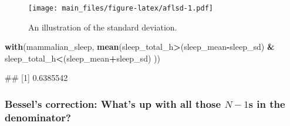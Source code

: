 \documentclass[
]{book}
\newenvironment{Shaded}{\begin{snugshade}}{\end{snugshade}}
\newcommand{\FunctionTok}[1]{\textcolor[rgb]{0.13,0.29,0.53}{\textbf{#1}}}
\newcommand{\NormalTok}[1]{#1}
\newcommand{\SpecialCharTok}[1]{\textcolor[rgb]{0.81,0.36,0.00}{\textbf{#1}}}
\begin{document}
\begin{figure}
\centering
\texttt{[image: main\_files/figure-latex/aflsd-1.pdf]}
\caption{\label{fig:aflsd}An illustration of the standard deviation.}
\end{figure}

\begin{Shaded}
\begin{Highlighting}[]
  \FunctionTok{with}\NormalTok{(mammalian\_sleep, }\FunctionTok{mean}\NormalTok{(sleep\_total\_h}\SpecialCharTok{\textgreater{}}\NormalTok{(sleep\_mean}\SpecialCharTok{{-}}\NormalTok{sleep\_sd) }\SpecialCharTok{\&}\NormalTok{ sleep\_total\_h}\SpecialCharTok{\textless{}}\NormalTok{(sleep\_mean}\SpecialCharTok{+}\NormalTok{sleep\_sd) ))}
\end{Highlighting}
\end{Shaded}

\begin{Shaded}
\begin{Highlighting}[]
\NormalTok{\#\# [1] 0.6385542}
\end{Highlighting}
\end{Shaded}

\subsubsection{\texorpdfstring{Bessel's correction: What's up with all those \(N-1\)s in the denominator?}{Bessel's correction: What's up with all those N-1s in the denominator?}}\label{bessels-correction-whats-up-with-all-those-n-1s-in-the-denominator}
\end{document}
